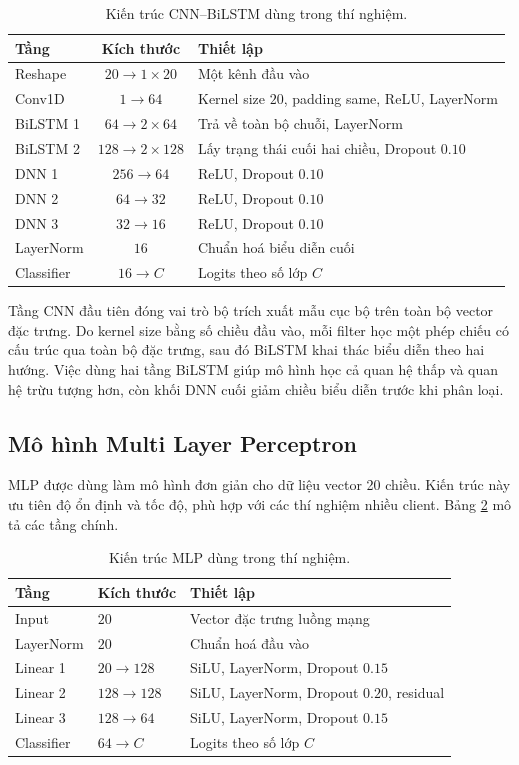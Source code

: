 \begin{table}[H]
\centering
\caption{Kiến trúc CNN--BiLSTM dùng trong thí nghiệm.}
\label{tab:dcblstm_arch}

\begin{tabularx}{\textwidth}{l c X}
\hline
Tầng & Kích thước & Thiết lập \\
\hline
Reshape & $20\rightarrow1\times20$ & Một kênh đầu vào \\
Conv1D & $1\rightarrow64$ & Kernel size $20$, padding same, ReLU, LayerNorm \\
BiLSTM 1 & $64\rightarrow2\times64$ & Trả về toàn bộ chuỗi, LayerNorm \\
BiLSTM 2 & $128\rightarrow2\times128$ & Lấy trạng thái cuối hai chiều, Dropout $0.10$ \\
DNN 1 & $256\rightarrow64$ & ReLU, Dropout $0.10$ \\
DNN 2 & $64\rightarrow32$ & ReLU, Dropout $0.10$ \\
DNN 3 & $32\rightarrow16$ & ReLU, Dropout $0.10$ \\
LayerNorm & $16$ & Chuẩn hoá biểu diễn cuối \\
Classifier & $16\rightarrow C$ & Logits theo số lớp $C$ \\
\hline
\end{tabularx}
\end{table}

Tầng CNN đầu tiên đóng vai trò bộ trích xuất mẫu cục bộ trên toàn bộ vector đặc trưng. Do kernel size bằng số chiều đầu vào, mỗi filter học một phép chiếu có cấu trúc qua toàn bộ đặc trưng, sau đó BiLSTM khai thác biểu diễn theo hai hướng. Việc dùng hai tầng BiLSTM giúp mô hình học cả quan hệ thấp và quan hệ trừu tượng hơn, còn khối DNN cuối giảm chiều biểu diễn trước khi phân loại.

\subsection{Mô hình Multi Layer Perceptron}

MLP được dùng làm mô hình đơn giản cho dữ liệu vector 20 chiều. Kiến trúc này ưu tiên độ ổn định và tốc độ, phù hợp với các thí nghiệm nhiều client. Bảng \ref{tab:mlp_arch} mô tả các tầng chính.

\begin{table}[H]
\centering
\caption{Kiến trúc MLP dùng trong thí nghiệm.}
\label{tab:mlp_arch}
\begin{tabular}{lll}
\hline
Tầng & Kích thước & Thiết lập \\
\hline
Input & $20$ & Vector đặc trưng luồng mạng \\
LayerNorm & $20$ & Chuẩn hoá đầu vào \\
Linear 1 & $20\rightarrow128$ & SiLU, LayerNorm, Dropout $0.15$ \\
Linear 2 & $128\rightarrow128$ & SiLU, LayerNorm, Dropout $0.20$, residual \\
Linear 3 & $128\rightarrow64$ & SiLU, LayerNorm, Dropout $0.15$ \\
Classifier & $64\rightarrow C$ & Logits theo số lớp $C$ \\
\hline
\end{tabular}
\end{table}

